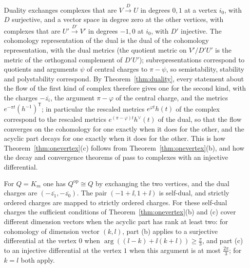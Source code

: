 \begin{remark}\label{rem:injective}
Duality exchanges complexes that are $V\xrightarrow{D}U$ in degrees $0,1$ at
a vertex $i_0$, with $D$ surjective, and a vector space in degree zero at the
other vertices, with complexes that are $U'\xrightarrow{D'}V'$ in degrees
$-1,0$ at $i_0$, with $D'$ injective. The cohomology representation of the
dual is the dual of the cohomology representation, with the dual metrics
(the quotient metric on $V'/D'U'$ is the metric of the orthogonal complement
of $D'U'$); subrepresentations correspond to quotients and arguments $\psi$
of central charges to $\pi-\psi$, so semistability, stability and
polystability correspond. By Theorem~\ref{thm:duality}, every statement
about the flow of the first kind of complex therefore gives one for the
second kind, with the charges $-\overline{z_i}$, the argument $\pi-\varphi$
of the central charge, and the metrics $e^{-\pi t}(h^{-1})^{\mathsf T}$; in
particular the rescaled metrics $e^{\varphi t}h(t)$ of the complex
correspond to the rescaled metrics $e^{(\pi-\varphi)t}h^\vee(t)$ of the dual,
so that the flow converges on the cohomology for one exactly when it does
for the other, and the acyclic part decays for one exactly when it does for
the other. This is how Theorem~\ref{thm:onevertex}(c) follows from
Theorem~\ref{thm:onevertex}(b), and how the decay and convergence theorems
of \cite{wue26b,wue26c} pass to complexes with an injective differential.

For $Q=K_m$ one has $Q^{\mathrm{op}}\cong Q$ by exchanging the two vertices,
and the dual charges are $(-\overline{z_1},-\overline{z_0})$. The pair
$(-1+\ii,1+\ii)$ is self-dual, and strictly ordered charges are mapped to
strictly ordered charges. For these self-dual charges the sufficient
conditions of Theorem~\ref{thm:onevertex}(b) and (c) cover different
dimension vectors when the acyclic part has rank at least two: for
cohomology of dimension vector $(k,l)$, part (b) applies to a surjective
differential at the vertex $0$ when
$\arg((l-k)+\ii(k+l))\geq\frac{\pi}3$, and part (c) to an injective
differential at the vertex $1$ when this argument is at most
$\frac{2\pi}3$; for $k=l$ both apply.
\end{remark}
